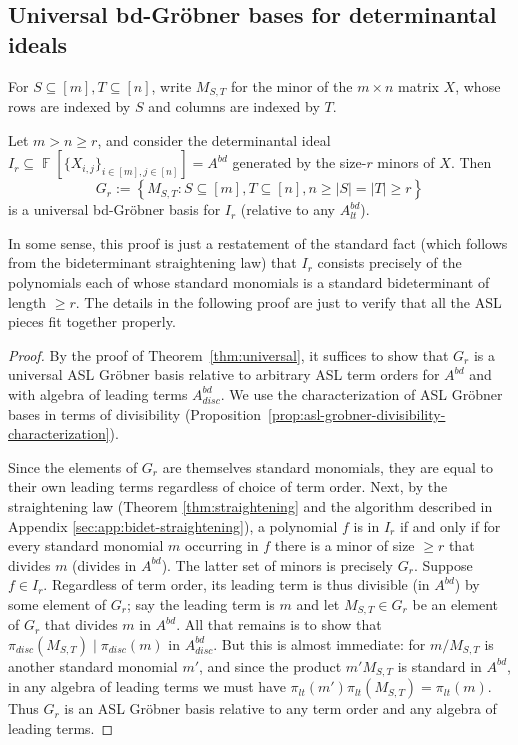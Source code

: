 \documentclass[11pt,reqno]{amsart}
\DeclareMathOperator{\F}{\mathbb{F}}
\newcommand{\divides}{\mid}
\theoremstyle{definition}
\numberwithin{equation}{section}
\begin{document}
\subsection{Universal bd-Gröbner bases for determinantal ideals}

For $S \subseteq [m], T \subseteq [n]$, write $M_{S,T}$ for the minor of the $m \times n$ matrix $X$, whose rows are indexed by $S$ and columns are indexed by $T$.
\begin{theorem}[store=thmtminorsbdgb]
\label{thm:t-minors-bdgb}
Let $m > n \geq r$, and consider the determinantal ideal $I_r \subseteq \F[\{X_{i, j}\}_{i \in [m], j \in [n]}] = A^{bd}$ generated by the size-$r$ minors of $X$. Then
\[
G_r := \left\{M_{S, T} : S \subseteq [m], T \subseteq[n], n \geq |S|=|T| \geq r\right\}
\]
is a universal bd-Gröbner basis for $I_r$ (relative to any $A_{lt}^{bd}$).
\end{theorem}

In some sense, this proof is just a restatement of the standard fact (which follows from the bideterminant straightening law) that $I_r$ consists precisely of the polynomials each of whose standard monomials is a standard bideterminant of length $\geq r$. The details in the following proof are just to verify that all the ASL pieces fit together properly. 

\begin{proof} 
By the proof of Theorem~\ref{thm:universal}, it suffices to show that $G_r$ is a universal ASL Gröbner basis relative to arbitrary ASL term orders for $A^{bd}$ and with algebra of leading terms $A^{bd}_{disc}$. We use the characterization of ASL Gröbner bases in terms of divisibility (Proposition~\ref{prop:asl-grobner-divisibility-characterization}).

Since the elements of $G_r$ are themselves standard monomials, they are equal to their own leading terms regardless of choice of term order. Next, by the straightening law (Theorem \ref{thm:straightening} and the algorithm described in Appendix \ref{sec:app:bidet-straightening}), a polynomial $f$ is in $I_r$ if and only if for every standard monomial $m$ occurring in $f$ there is a minor of size $\geq r$ that divides $m$ (divides in $A^{bd}$). The latter set of minors is precisely $G_r$. Suppose $f \in I_r$. Regardless of term order, its leading term is thus divisible (in $A^{bd}$) by some element of $G_r$; say the leading term is $m$ and let $M_{S,T} \in G_r$ be an element of $G_r$ that divides $m$ in $A^{bd}$. All that remains is to show that $\pi_{disc}(M_{S,T}) \divides \pi_{disc}(m)$ in $A^{bd}_{disc}$. But this is almost immediate: for $m / M_{S,T}$ is another standard monomial $m'$, and since the product $m' M_{S,T}$ is standard in $A^{bd}$, in any algebra of leading terms we must have $\pi_{lt}(m') \pi_{lt}(M_{S,T}) = \pi_{lt}(m)$. Thus $G_r$ is an ASL Gröbner basis relative to any term order and any algebra of leading terms.
\end{proof}
\end{document}
